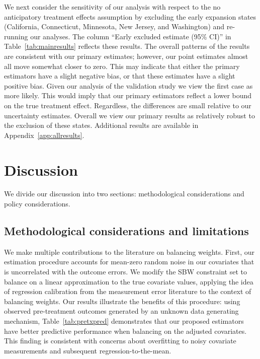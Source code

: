 \documentclass[aoas]{imsart}
\theoremstyle{plain}
\theoremstyle{remark}
\begin{document}
We next consider the sensitivity of our analysis with respect to the no anticipatory treatment effects assumption by excluding the early expansion states (California, Connecticut, Minnesota, New Jersey, and Washington) and re-running our analyses. The column ``Early excluded estimate (95\% CI)'' in Table~\ref{tab:mainresults} reflects these results. The overall patterns of the results are consistent with our primary estimates; however, our point estimates almost all move somewhat closer to zero. This may indicate that either the primary estimators have a slight negative bias, or that these estimates have a slight positive bias. Given our analysis of the validation study we view the first case as more likely. This would imply that our primary estimators reflect a lower bound on the true treatment effect. Regardless, the differences are small relative to our uncertainty estimates. Overall we view our primary results as relatively robust to the exclusion of these states. Additional results are available in Appendix~\ref{app:allresults}.

\section{Discussion}

We divide our discussion into two sections: methodological considerations and policy considerations. 

\subsection{Methodological considerations and limitations}

We make multiple contributions to the literature on balancing weights. First, our estimation procedure accounts for mean-zero random noise in our covariates that is uncorrelated with the outcome errors. We modify the SBW constraint set to balance on a linear approximation to the true covariate values, applying the idea of regression calibration from the measurement error literature to the context of balancing weights. Our results illustrate the benefits of this procedure: using observed pre-treatment outcomes generated by an unknown data generating mechanism, Table~\ref{tab:pretxpred} demonstrates that our proposed estimators have better predictive performance when balancing on the adjusted covariates. This finding is consistent with concerns about overfitting to noisy covariate measurements and subsequent regression-to-the-mean.
\end{document}

